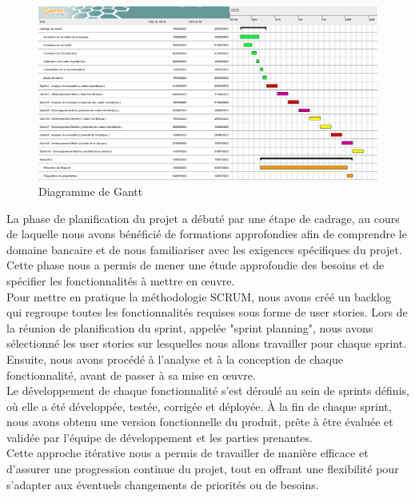 \begin{figure}[!h]
    \centering %
        \includegraphics[width=16cm]{images/conduite/gantt.png}
    \caption{Diagramme de Gantt}
\end{figure}

\newpage

La phase de planification du projet a débuté par une étape de cadrage, au cours de laquelle nous avons bénéficié de formations approfondies afin de comprendre le domaine bancaire et de nous familiariser avec les exigences spécifiques du projet. Cette phase nous a permis de mener une étude approfondie des besoins et de spécifier les fonctionnalités à mettre en œuvre.\\

Pour mettre en pratique la méthodologie SCRUM, nous avons créé un backlog qui regroupe toutes les fonctionnalités requises sous forme de user stories. Lors de la réunion de planification du sprint, appelée "sprint planning", nous avons sélectionné les user stories sur lesquelles nous allons travailler pour chaque sprint. Ensuite, nous avons procédé à l'analyse et à la conception de chaque fonctionnalité, avant de passer à sa mise en œuvre.\\

Le développement de chaque fonctionnalité s'est déroulé au sein de sprints définis, où elle a été développée, testée, corrigée et déployée. À la fin de chaque sprint, nous avons obtenu une version fonctionnelle du produit, prête à être évaluée et validée par l'équipe de développement et les parties prenantes.\\

Cette approche itérative nous a permis de travailler de manière efficace et d'assurer une progression continue du projet, tout en offrant une flexibilité pour s'adapter aux éventuels changements de priorités ou de besoins.


